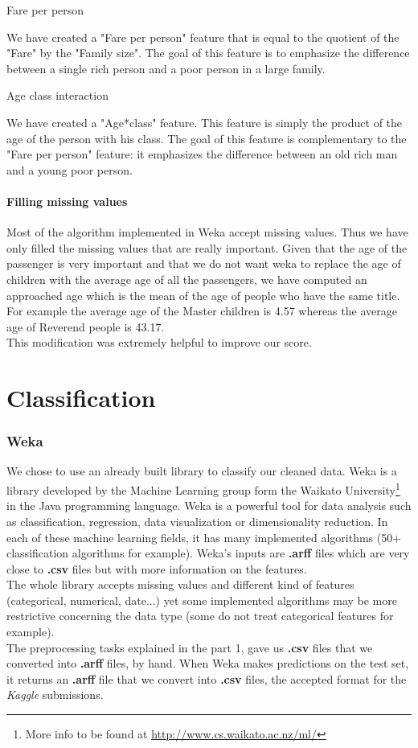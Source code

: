 \documentclass[11pt,a4paper,portrait]{article}
\begin{document}
\subparagraph{Fare per person}
We have created a "Fare per person" feature that is equal to the quotient of the "Fare" by the "Family size". The goal of this feature is to emphasize the difference between a single rich person and a poor person in a large family.

\subparagraph{Age class interaction}
We have created a "Age*class" feature. This feature is simply the product of the age of the person with his class. The goal of this feature is complementary to the "Fare per person" feature: it emphasizes the difference between an old rich man and a young poor person.


\subsection{Filling missing values}
Most of the algorithm implemented in Weka accept missing values. Thus we have only filled the missing values that are really important. Given that the age of the passenger is very important and that we do not want weka to replace the age of children with the average age of all the passengers, we have computed an approached age which is the mean of the age of people who have the same title. For example the average age of the Master children is 4.57 whereas the average age of Reverend people is 43.17.\\
This modification was extremely helpful to improve our score.


\part{Classification}
\setcounter{section}{0}

\section{Weka}
We chose to use an already built library to classify our cleaned data. Weka is a library developed by the Machine Learning group form the Waikato University\footnote{More info to be found at \url{http://www.cs.waikato.ac.nz/ml/}} in the Java programming language. Weka is a powerful tool for data analysis such as classification, regression, data visualization or dimensionality reduction. In each of these machine learning fields, it has many implemented algorithms (50+ classification algorithms for example). Weka's inputs are \textbf{.arff} files which are very close to \textbf{.csv} files but with more information on the features.\\
The whole library accepts missing values and different kind of features (categorical, numerical, date...) yet some implemented algorithms may be more restrictive concerning the data type (some do not treat categorical features for example).\\
The preprocessing tasks explained in the part 1, gave us \textbf{.csv} files that we converted into \textbf{.arff} files, by hand. When Weka makes predictions on the test set, it returns an \textbf{.arff} file that we convert into \textbf{.csv} files, the accepted format for the \textit{Kaggle} submissions.
\end{document}
